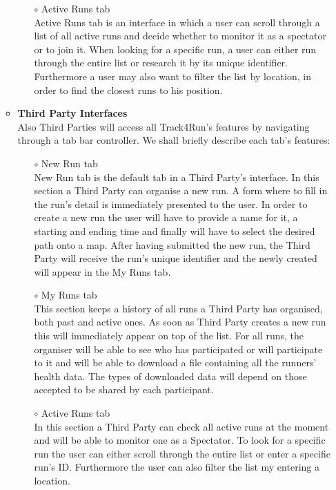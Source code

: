 \documentclass[titlepage]{article}
\begin{document}
\begin{itemize}
\begin{itemize}
\begin{itemize}
					\item[$\circ$] Active Runs tab \\
Active Runs tab is an interface in which a user can scroll through a list of all active runs and decide whether to monitor it as a spectator or to join it. When looking for a specific run, a user can either run through the entire list or research it by its unique identifier. Furthermore a user may also want to filter the list by location, in order to find the closest runs to his position.\\
				\end{itemize}
				\item{\bf Third Party Interfaces} \\
			Also Third Parties will access all Track4Run’s features by navigating through a tab bar controller. We shall briefly describe each tab’s features:
				\begin{itemize}
					\item[$\circ$] New Run tab \\
					New Run tab is the default tab in a Third Party’s interface. In this section a Third Party can organise a new run. A form where to fill in the run’s detail is immediately presented to the user. In order to create a new run the user will have to provide a name for it, a starting and ending time and finally will have to select the desired path onto a map. After having submitted the new run, the Third Party will receive the run’s unique identifier and the newly created will appear in the My Runs tab.
					\item[$\circ$] My Runs tab \\
					This section keeps a history of all runs a Third Party has organised, both past and active ones. As soon as Third Party creates a new run this will immediately appear on top of the list. For all runs, the organiser will be able to see who has participated or will participate to it and will be able to download a file containing all the runners’ health data. The types of downloaded data will depend on those accepted to be shared by each participant. 
					\item[$\circ$] Active Runs tab \\
					In this section a Third Party can check all active runs at the moment and will be able to monitor one as a Spectator. To look for a specific run the user can either scroll through the entire list or enter a specific run’s ID. Furthermore the user can also filter the list my entering a location.


\end{itemize}
\end{itemize}
\end{itemize}
\end{document}
